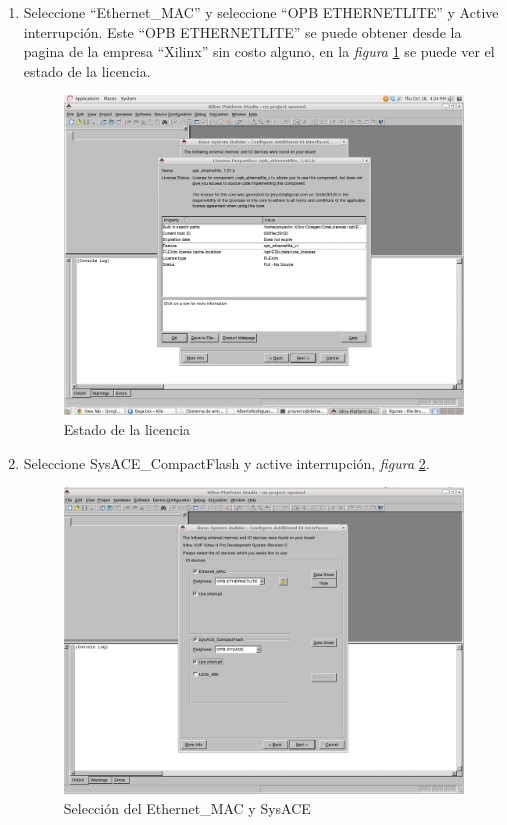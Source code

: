 \begin{enumerate}
   
\item Seleccione ``Ethernet\_MAC'' y seleccione ``OPB ETHERNETLITE'' y Active
interrupción. Este ``OPB ETHERNETLITE'' se puede obtener desde la pagina de la
empresa ``Xilinx'' sin costo alguno, en la  \emph{figura}
\ref{lic} se puede ver el estado de la licencia.
  \begin{figure}[h!] 
  \centering
  \includegraphics[scale=.25]{./figuras/lic.png}
  \caption{Estado de la licencia}
  \label{lic}
  \end{figure}
  
  
\item Seleccione SysACE\_CompactFlash y active interrupción,  \emph{figura}
\ref{Selección del SysACE}.
  \begin{figure}[h!] 
  \centering
  \includegraphics[scale=.25]{./figuras/EDK7.png}
  \caption{Selección del  Ethernet\_MAC y SysACE}
  \label{Selección del SysACE}
  \end{figure}
  

\end{enumerate}
